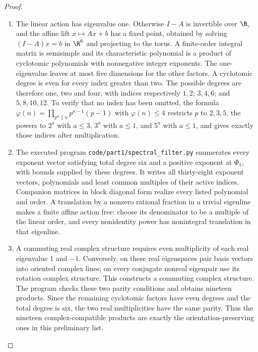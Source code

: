 \documentclass[11pt,a4paper]{article}
\theoremstyle{definition}
\begin{document}
\begin{proof}
\begin{enumerate}[label=\arabic*.]
\item The linear action has eigenvalue one. Otherwise $I-A$ is
invertible over $\R$, and the affine lift $x\mapsto Ax+b$
has a fixed point, obtained by solving $(I-A)x=b$ in $\R^6$
and projecting to the torus. A finite-order integral matrix is
semisimple and its characteristic polynomial is a product of
cyclotomic polynomials with nonnegative integer exponents.
The one-eigenvalue leaves at most five dimensions for the other
factors. A cyclotomic degree is even for every index greater
than two. The possible degrees are therefore one, two and four,
with indices respectively $1,2$; $3,4,6$; and $5,8,10,12$.
To verify that no index has been omitted, the formula
$\varphi(n)=\prod_{p^a\parallel n}p^{a-1}(p-1)$ with
$\varphi(n)\le4$ restricts $p$ to $2,3,5$, the powers to
$2^a$ with $a\le3$, $3^a$ with $a\le1$, and $5^a$ with
$a\le1$, and gives exactly those indices after multiplication.

\item The executed program \texttt{code/part1/spectral\_filter.py}
enumerates every exponent vector satisfying total degree six
and a positive exponent at $\Phi_1$, with bounds supplied by
these degrees. It writes all thirty-eight exponent vectors,
polynomials and least common multiples of their active indices.
Companion matrices in block diagonal form realize every listed
polynomial and order. A translation by a nonzero rational
fraction in a trivial eigenline makes a finite affine action
free: choose its denominator to be a multiple of the linear
order, and every nonidentity power has nonintegral translation
in that eigenline.

\item A commuting real complex structure requires even multiplicity
of each real eigenvalue $1$ and $-1$. Conversely, on these real
eigenspaces pair basis vectors into oriented complex lines;
on every conjugate nonreal eigenpair use its rotation complex
structure. This constructs a commuting complex structure.
The program checks these two parity conditions and obtains
nineteen products. Since the remaining cyclotomic factors have
even degrees and the total degree is six, the two real
multiplicities have the same parity. Thus the nineteen
complex-compatible products are exactly the orientation-preserving
ones in this preliminary list.

\end{enumerate}
\end{proof}
\end{document}
